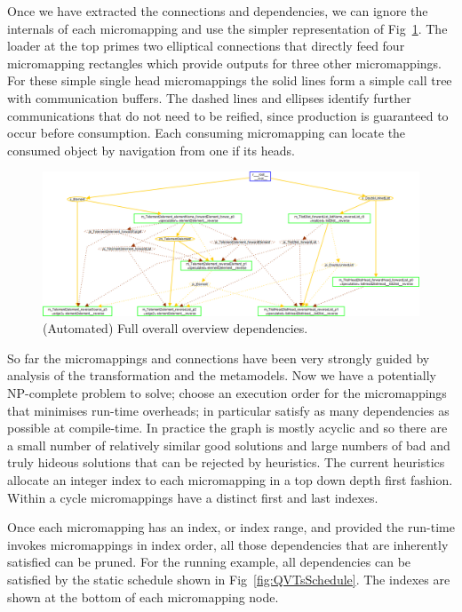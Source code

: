 \documentclass{llncs}
\begin{document}
Once we have extracted the connections and dependencies, we can ignore the internals of each micromapping and use the simpler representation of Fig~\ref{fig:QVTsFullDependencies}. The loader at the top primes two elliptical connections that directly feed four micromapping rectangles which provide outputs for three other micromappings. For these simple single head micromappings the solid lines form a simple call tree with communication buffers. The dashed lines and ellipses identify further communications that do not need to be reified, since production is guaranteed to occur before consumption. Each consuming micromapping can locate the consumed object by navigation from one if its heads. 

\begin{figure}[h]
	\centering
	\includegraphics[width=1.0\textwidth]{QVTsDependencies.png}
	\caption{(Automated) Full overall overview dependencies.}
	\label{fig:QVTsFullDependencies}
\end{figure}

So far the micromappings and connections have been very strongly guided by analysis of the transformation and the metamodels. Now we have a potentially NP-complete problem to solve; choose an execution order for the micromappings that minimises run-time overheads; in particular satisfy as many dependencies as possible at compile-time. In practice the graph is mostly acyclic and so there are a small number of relatively similar good solutions and large numbers of bad and truly hideous solutions that can be rejected by heuristics. The current heuristics allocate an integer index to each micromapping in a top down depth first fashion. Within a cycle micromappings have a distinct first and last indexes.

Once each micromapping has an index, or index range, and provided the run-time invokes micromappings in index order, all those dependencies that are inherently satisfied can be pruned. For the running example, all dependencies can be satisfied by the static schedule shown in Fig~\ref{fig:QVTsSchedule}. The indexes are shown at the bottom of each micromapping node.
\end{document}
